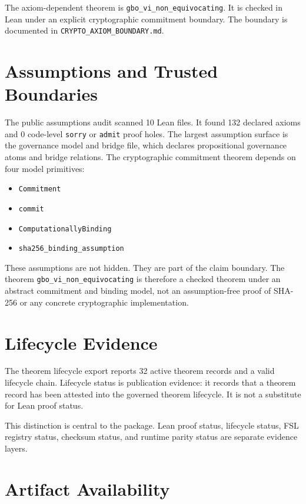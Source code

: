 \documentclass[11pt]{article}
\begin{document}
The axiom-dependent theorem is \texttt{gbo\_vi\_non\_equivocating}. It is checked in Lean under an explicit cryptographic commitment boundary. The boundary is documented in \texttt{CRYPTO\_AXIOM\_BOUNDARY.md}.

\section{Assumptions and Trusted Boundaries}

The public assumptions audit scanned 10 Lean files. It found 132 declared axioms and 0 code-level \texttt{sorry} or \texttt{admit} proof holes. The largest assumption surface is the governance model and bridge file, which declares propositional governance atoms and bridge relations. The cryptographic commitment theorem depends on four model primitives:

\begin{itemize}[leftmargin=*]
  \item \texttt{Commitment}
  \item \texttt{commit}
  \item \texttt{ComputationallyBinding}
  \item \texttt{sha256\_binding\_assumption}
\end{itemize}

These assumptions are not hidden. They are part of the claim boundary. The theorem \texttt{gbo\_vi\_non\_equivocating} is therefore a checked theorem under an abstract commitment and binding model, not an assumption-free proof of SHA-256 or any concrete cryptographic implementation.

\section{Lifecycle Evidence}

The theorem lifecycle export reports 32 active theorem records and a valid lifecycle chain. Lifecycle status is publication evidence: it records that a theorem record has been attested into the governed theorem lifecycle. It is not a substitute for Lean proof status.

This distinction is central to the package. Lean proof status, lifecycle status, FSL registry status, checksum status, and runtime parity status are separate evidence layers.

\section{Artifact Availability}
\end{document}
